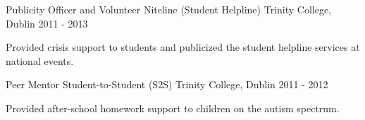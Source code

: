\begin{cventries}
  \cventry
    {Publicity Officer and Volunteer} %
    {Niteline (Student Helpline)} %
    {Trinity College, Dublin}
    {2011 - 2013} %
    {
      \begin{cvitems} %
        \item {Provided crisis support to students and publicized the student helpline services at national events.}
      \end{cvitems}
    }
    
  \cventry
    {Peer Mentor} %
    {Student-to-Student (S2S)} %
    {Trinity College, Dublin}
    {2011 - 2012} %
    {
      \begin{cvitems} %
        \item {Provided after-school homework support to children on the autism spectrum.}
      \end{cvitems}
    }

\end{cventries}
